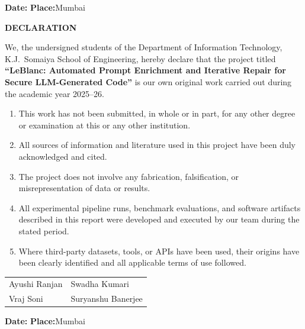 \documentclass[12pt,a4paper]{report}
\begin{document}
\vspace{0.5in}
\noindent\textbf{Date:}\enspace\underline{\hspace{1.8in}}\hfill
\textbf{Place:}\enspace Mumbai

\newpage
\thispagestyle{empty}
\begin{center}{\Large\bfseries DECLARATION}\end{center}
\vspace{0.25in}
\noindent We, the undersigned students of the Department of Information Technology,
K.J.\ Somaiya School of Engineering, hereby declare that the project titled
\textbf{``LeBlanc: Automated Prompt Enrichment and Iterative Repair for Secure
LLM-Generated Code''} is our own original work carried out during the academic
year 2025--26.

\vspace{0.15in}
\begin{enumerate}
  \item This work has not been submitted, in whole or in part, for any other
        degree or examination at this or any other institution.
  \item All sources of information and literature used in this project have been
        duly acknowledged and cited.
  \item The project does not involve any fabrication, falsification, or
        misrepresentation of data or results.
  \item All experimental pipeline runs, benchmark evaluations, and software
        artifacts described in this report were developed and executed by our
        team during the stated period.
  \item Where third-party datasets, tools, or APIs have been used, their origins
        have been clearly identified and all applicable terms of use followed.
\end{enumerate}

\vspace{0.45in}
\noindent
\begin{tabular}{@{}p{2.8in}p{2.5in}@{}}
  Ayushi Ranjan      & Swadha Kumari      \\[0.5in]
  Vraj Soni          & Suryanshu Banerjee \\
\end{tabular}

\vspace{0.3in}
\noindent\textbf{Date:}\enspace\underline{\hspace{1.8in}}\hfill
\textbf{Place:}\enspace Mumbai
\end{document}
